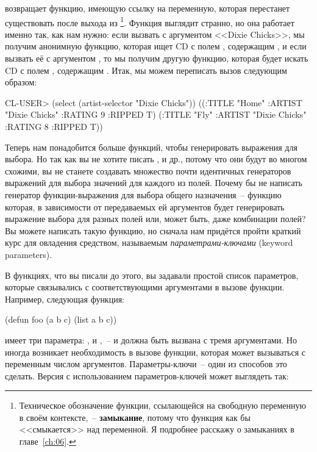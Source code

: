  возвращает функцию, имеющую ссылку на переменную, которая
перестанет существовать после выхода из \footnote{Техническое
  обозначение функции, ссылающейся на свободную переменную в своём контексте,~--
  \textbf{замыкание}, потому что функция как бы <<смыкается>> над переменной. Я подробнее
  расскажу о замыканиях в главе~\ref{ch:06}.}. Функция выглядит странно, но она работает именно так,
как нам нужно: если вызвать  с аргументом <<Dixie Chicks>>, мы
получим анонимную функцию, которая ищет CD с полем , содержащим , и если вызвать её с аргументом , то мы получим другую функцию,
которая будет искать CD с полем , содержащим . Итак, мы можем
переписать вызов  следующим образом:

\begin{myverb}
  CL-USER> (select (artist-selector "Dixie Chicks"))
    ((:TITLE "Home" :ARTIST "Dixie Chicks" :RATING 9 :RIPPED T)
     (:TITLE "Fly" :ARTIST "Dixie Chicks" :RATING 8 :RIPPED T))
\end{myverb}

Теперь нам понадобится больше функций, чтобы генерировать выражения для выбора. Но так как
вы не хотите писать ,  и др., потому что они
будут во многом схожими, вы не станете создавать множество почти идентичных генераторов
выражений для выбора значений для каждого из полей. Почему бы не написать генератор
функции-выражения для выбора общего назначения~-- функцию которая, в зависимости от
передаваемых ей аргументов будет генерировать выражение выбора для разных полей или,
может быть, даже комбинации полей? Вы можете написать такую функцию, но сначала нам
придётся пройти краткий курс для овладения средством, называемым
\textit{параметрами-ключами} (keyword parameters).

В функциях, что вы писали до этого, вы задавали простой список параметров, которые
связывались с соответствующими аргументами в вызове функции. Например, следующая функция:

\begin{myverb}
(defun foo (a b c) (list a b c))
\end{myverb}

\noindent{}имеет три параметра: ,  и ,~-- и должна быть вызвана с тремя
аргументами. Но иногда возникает необходимость в вызове функции, которая может вызываться
с переменным числом аргументов. Параметры-ключи~-- один из способов это сделать. Версия
 с использованием параметров-ключей может выглядеть так:

